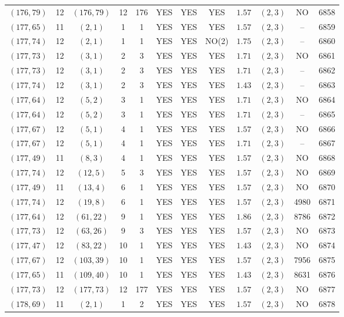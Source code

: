 \begin{longtable}{|c|c|c|c|c|c|c|c|c|c|c|c|}
$(176,79)$ & 12 & $(176,79)$ & 12 & 176 & YES & YES & YES & $1.57$ & $(2,3)$ & NO & 6858\\
$(177,65)$ & 11 & $(2,1)$ & 1 & 1 & YES & YES & YES & $1.57$ & $(2,3)$ & -- & 6859\\
$(177,74)$ & 12 & $(2,1)$ & 1 & 1 & YES & YES & NO(2) & $1.75$ & $(2,3)$ & -- & 6860\\
$(177,73)$ & 12 & $(3,1)$ & 2 & 3 & YES & YES & YES & $1.71$ & $(2,3)$ & NO & 6861\\
$(177,73)$ & 12 & $(3,1)$ & 2 & 3 & YES & YES & YES & $1.71$ & $(2,3)$ & -- & 6862\\
$(177,74)$ & 12 & $(3,1)$ & 2 & 3 & YES & YES & YES & $1.43$ & $(2,3)$ & -- & 6863\\
$(177,64)$ & 12 & $(5,2)$ & 3 & 1 & YES & YES & YES & $1.71$ & $(2,3)$ & NO & 6864\\
$(177,64)$ & 12 & $(5,2)$ & 3 & 1 & YES & YES & YES & $1.71$ & $(2,3)$ & -- & 6865\\
$(177,67)$ & 12 & $(5,1)$ & 4 & 1 & YES & YES & YES & $1.57$ & $(2,3)$ & NO & 6866\\
$(177,67)$ & 12 & $(5,1)$ & 4 & 1 & YES & YES & YES & $1.71$ & $(2,3)$ & -- & 6867\\
$(177,49)$ & 11 & $(8,3)$ & 4 & 1 & YES & YES & YES & $1.57$ & $(2,3)$ & NO & 6868\\
$(177,74)$ & 12 & $(12,5)$ & 5 & 3 & YES & YES & YES & $1.57$ & $(2,3)$ & NO & 6869\\
$(177,49)$ & 11 & $(13,4)$ & 6 & 1 & YES & YES & YES & $1.57$ & $(2,3)$ & NO & 6870\\
$(177,74)$ & 12 & $(19,8)$ & 6 & 1 & YES & YES & YES & $1.57$ & $(2,3)$ & 4980 & 6871\\
$(177,64)$ & 12 & $(61,22)$ & 9 & 1 & YES & YES & YES & $1.86$ & $(2,3)$ & 8786 & 6872\\
$(177,73)$ & 12 & $(63,26)$ & 9 & 3 & YES & YES & YES & $1.57$ & $(2,3)$ & NO & 6873\\
$(177,47)$ & 12 & $(83,22)$ & 10 & 1 & YES & YES & YES & $1.43$ & $(2,3)$ & NO & 6874\\
$(177,67)$ & 12 & $(103,39)$ & 10 & 1 & YES & YES & YES & $1.57$ & $(2,3)$ & 7956 & 6875\\
$(177,65)$ & 11 & $(109,40)$ & 10 & 1 & YES & YES & YES & $1.43$ & $(2,3)$ & 8631 & 6876\\
$(177,73)$ & 12 & $(177,73)$ & 12 & 177 & YES & YES & YES & $1.57$ & $(2,3)$ & NO & 6877\\
$(178,69)$ & 11 & $(2,1)$ & 1 & 2 & YES & YES & YES & $1.57$ & $(2,3)$ & NO & 6878\\

\end{longtable}
